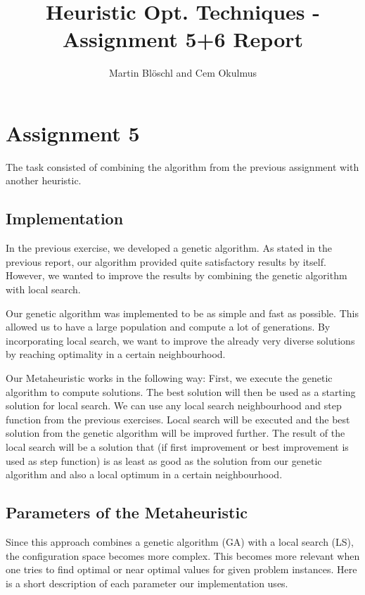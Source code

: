 \documentclass [11pt]{article}
\begin{document}
\title{ Heuristic Opt. Techniques - Assignment 5+6 Report}
\author{ Martin Blöschl and Cem Okulmus }

\maketitle
\thispagestyle{empty}


\section{Assignment 5}

The task consisted of combining the algorithm from the previous assignment with another heuristic. 


\subsection{Implementation}

In the previous exercise, we developed a genetic algorithm. As stated in the previous report, our algorithm provided quite satisfactory results by itself. However, we wanted to improve the results by combining the genetic algorithm with local search.

Our genetic algorithm was implemented to be as simple and fast as possible. This allowed us to have a large population and compute a lot of generations. By incorporating local search, we want to improve the already very diverse solutions by reaching optimality in a certain neighbourhood.

Our Metaheuristic works in the following way: First, we execute the genetic algorithm to compute solutions. The best solution will then be used as a starting solution for local search. We can use any local search neighbourhood and step function from the previous exercises. Local search will be executed and the best solution from the genetic algorithm will be improved further. The result of the local search will  be a solution that (if first improvement or best improvement is used as step function) is as least as good as the solution from our genetic algorithm and also a local optimum in a certain neighbourhood.

\subsection{Parameters of the Metaheuristic}

Since this approach combines a genetic algorithm (GA) with a local search (LS), the configuration space becomes more complex. This becomes more relevant when one tries to find optimal or near optimal values for given problem instances. Here is a short description of each parameter our implementation uses. 
\end{document}
